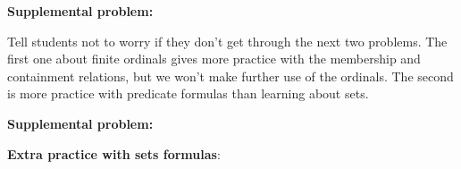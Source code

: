 \documentclass[handout]{mcs}
\begin{document}



\textbf{Supplemental problem:}


\begin{staffnotes}
Tell students not to worry if they don't get through the next two
problems.  The first one about finite ordinals gives more practice
with the membership and containment relations, but we won't make
further use of the ordinals.  The second is more practice with
predicate formulas than learning about sets.
\end{staffnotes}

\textbf{Supplemental problem:}


\textbf{Extra practice with sets formulas}:





\end{document}
